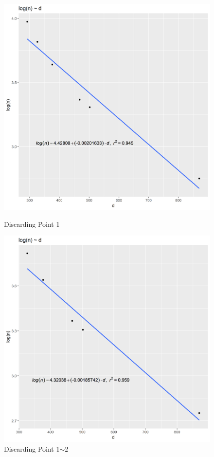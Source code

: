 \documentclass{article}
\begin{document}
\begin{figure}[H]
\begin{minipage}[t]{0.5\textwidth}
                    \includegraphics[width = 0.8\linewidth]{../Data/discard_2.png}
                    \caption{Discarding Point 1}
                    \label{dis.1}
                \end{minipage}
                \begin{minipage}[t]{0.5\textwidth}
                    \centering
                    \includegraphics[width = 0.8\linewidth]{../Data/discard_3.png}
                    \caption{Discarding Point 1$\sim$2}
                    \label{dis.2}
                \end{minipage}
                \begin{minipage}[t]{0.5\textwidth}

\end{minipage}
\end{figure}
\end{document}
